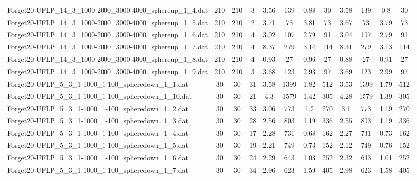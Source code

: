 \begin{sidewaystable}[!ht]
{\begin{tabular}{lccccccccccc}
Forget20-UFLP\_14\_3\_1000-2000\_3000-4000\_sphereup\_1\_4.dat & 210 & 210 & 3 & 3.56 & 139 & 0.88 & 30 & 3.58 & 139 &  \textcolor{blue2}{0.8} & 30 \\
Forget20-UFLP\_14\_3\_1000-2000\_3000-4000\_sphereup\_1\_5.dat & 210 & 210 & 2 & 3.71 & 73 & 3.81 & 73 &  \textcolor{blue2}{3.67} & 73 & 3.79 & 73 \\
Forget20-UFLP\_14\_3\_1000-2000\_3000-4000\_sphereup\_1\_6.dat & 210 & 210 & 4 & 3.02 & 107 &  \textcolor{blue2}{2.79} & 91 & 3.04 & 107 &  \textcolor{blue2}{2.79} & 91 \\
Forget20-UFLP\_14\_3\_1000-2000\_3000-4000\_sphereup\_1\_7.dat & 210 & 210 & 4 & 8.37 & 279 & 3.14 & 114 & 8.31 & 279 &  \textcolor{blue2}{3.13} & 114 \\
Forget20-UFLP\_14\_3\_1000-2000\_3000-4000\_sphereup\_1\_8.dat & 210 & 210 & 4 & 0.93 & 27 & 0.96 & 27 &  \textcolor{blue2}{0.88} & 27 & 0.91 & 27 \\
Forget20-UFLP\_14\_3\_1000-2000\_3000-4000\_sphereup\_1\_9.dat & 210 & 210 & 3 & 3.68 & 123 &  \textcolor{blue2}{2.93} & 97 & 3.69 & 123 & 2.99 & 97 \\
Forget20-UFLP\_5\_3\_1-1000\_1-100\_spheredown\_1\_1.dat & 30 & 30 & 31 & 3.58 & 1399 & 1.82 & 512 & 3.53 & 1399 &  \textcolor{blue2}{1.79} & 512 \\
Forget20-UFLP\_5\_3\_1-1000\_1-100\_spheredown\_1\_10.dat & 30 & 30 & 21 & 4.3 & 1579 & 1.42 & 305 & 4.28 & 1579 & 1.39 & 305 \\
Forget20-UFLP\_5\_3\_1-1000\_1-100\_spheredown\_1\_2.dat & 30 & 30 & 33 & 3.06 & 773 & 1.2 & 270 & 3.1 & 773 &  \textcolor{blue2}{1.19} & 270 \\
Forget20-UFLP\_5\_3\_1-1000\_1-100\_spheredown\_1\_3.dat & 30 & 30 & 28 & 2.56 & 803 & 1.19 & 336 & 2.55 & 803 & 1.19 & 336 \\
Forget20-UFLP\_5\_3\_1-1000\_1-100\_spheredown\_1\_4.dat & 30 & 30 & 17 & 2.28 & 731 &  \textcolor{blue2}{0.68} & 162 & 2.27 & 731 & 0.73 & 162 \\
Forget20-UFLP\_5\_3\_1-1000\_1-100\_spheredown\_1\_5.dat & 30 & 30 & 19 & 2.21 & 749 &  \textcolor{blue2}{0.73} & 152 & 2.12 & 749 & 0.76 & 152 \\
Forget20-UFLP\_5\_3\_1-1000\_1-100\_spheredown\_1\_6.dat & 30 & 30 & 24 & 2.29 & 643 & 1.03 & 252 & 2.32 & 643 & 1.01 & 252 \\
Forget20-UFLP\_5\_3\_1-1000\_1-100\_spheredown\_1\_7.dat & 30 & 30 & 34 & 2.96 & 623 & 1.59 & 405 & 2.98 & 623 &  \textcolor{blue2}{1.58} & 405 \\

\end{tabular}}
\end{sidewaystable}

